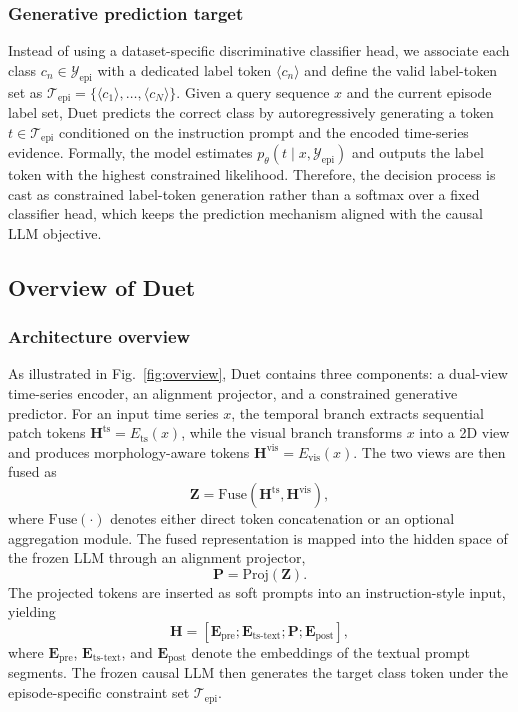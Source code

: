 \documentclass[lettersize,journal]{IEEEtran}
\begin{document}
\subsubsection{Generative prediction target}
Instead of using a dataset-specific discriminative classifier head, we associate each class 
$c_n\in\mathcal{Y}_{\mathrm{epi}}$ with a dedicated label token $\langle c_n\rangle$ and define the valid label-token set as
$\mathcal{T}_{\mathrm{epi}}=\{\langle c_1\rangle,\ldots,\langle c_N\rangle\}$. 
Given a query sequence $x$ and the current episode label set, Duet predicts the correct class by autoregressively generating a token 
$t\in\mathcal{T}_{\mathrm{epi}}$ conditioned on the instruction prompt and the encoded time-series evidence. 
Formally, the model estimates $p_{\theta}(t\mid x,\mathcal{Y}_{\mathrm{epi}})$ and outputs the label token with the highest constrained likelihood. 
Therefore, the decision process is cast as constrained label-token generation rather than a softmax over a fixed classifier head, which keeps the prediction mechanism aligned with the causal LLM objective.

\subsection{Overview of Duet}
\subsubsection{Architecture overview}
As illustrated in Fig.~\ref{fig:overview}, Duet contains three components: a dual-view time-series encoder, an alignment projector, and a constrained generative predictor. 
For an input time series $x$, the temporal branch extracts sequential patch tokens
$\mathbf{H}^{\mathrm{ts}}=E_{\mathrm{ts}}(x)$, while the visual branch transforms $x$ into a 2D view and produces morphology-aware tokens
$\mathbf{H}^{\mathrm{vis}}=E_{\mathrm{vis}}(x)$. 
The two views are then fused as
\[
\mathbf{Z}=\mathrm{Fuse}(\mathbf{H}^{\mathrm{ts}},\mathbf{H}^{\mathrm{vis}}),
\]
where $\mathrm{Fuse}(\cdot)$ denotes either direct token concatenation or an optional aggregation module. 
The fused representation is mapped into the hidden space of the frozen LLM through an alignment projector,
\[
\mathbf{P}=\mathrm{Proj}(\mathbf{Z}).
\]
The projected tokens are inserted as soft prompts into an instruction-style input, yielding
\[
\mathbf{H}=
[\mathbf{E}_{\mathrm{pre}};\mathbf{E}_{\mathrm{ts\text{-}text}};\mathbf{P};\mathbf{E}_{\mathrm{post}}],
\]
where $\mathbf{E}_{\mathrm{pre}}$, $\mathbf{E}_{\mathrm{ts\text{-}text}}$, and $\mathbf{E}_{\mathrm{post}}$ denote the embeddings of the textual prompt segments. 
The frozen causal LLM then generates the target class token under the episode-specific constraint set $\mathcal{T}_{\mathrm{epi}}$.
\end{document}
